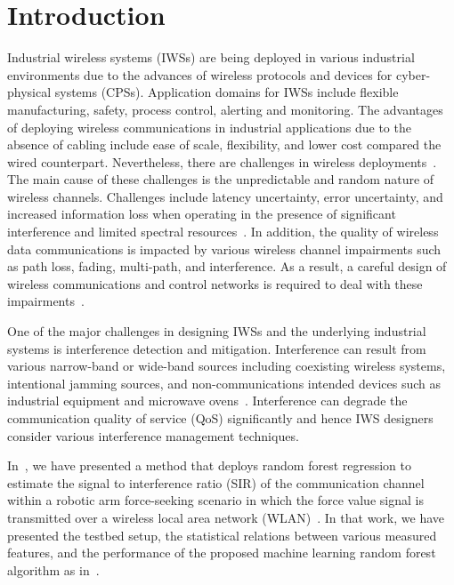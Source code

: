 	
	\section{Introduction} \label{ftml:sec:intro}    
	Industrial wireless systems (IWSs) are being deployed in various industrial environments due to the advances of wireless protocols and devices for cyber-physical systems (CPSs). Application domains for IWSs include flexible manufacturing, safety, process control, alerting and monitoring\cite{Candell2018.IWSGuide}. The advantages of deploying wireless communications in industrial applications due to the absence of cabling include ease of scale, flexibility, and lower cost compared the wired counterpart. Nevertheless, there are challenges in wireless deployments~\cite{Sisinni2018,Bello2017,Pang2017.WirelessChallenges}. The main cause of these challenges is the unpredictable and random nature of wireless channels. Challenges include latency uncertainty, error uncertainty, and  increased information loss when operating in the presence of significant interference and limited spectral resources~\cite{Candell2017.SAS.IWSWorkshopReport}. In addition, the quality of wireless data communications is impacted by various wireless channel impairments such as path loss, fading, multi-path, and interference. As a result, a careful design of wireless communications and control networks is required to deal with these impairments~\cite{Lu2016.WirelessCPS,Kim2017.WirelessCodesign}.    
    
    One of the major challenges in designing IWSs and the underlying industrial systems is interference detection and mitigation. Interference can result from various narrow-band or wide-band sources including  coexisting wireless systems, intentional jamming sources, and non-communications intended devices such as industrial equipment and microwave ovens~\cite{Chiwewe2015.Survey.CR.Intf}. Interference can degrade the communication quality of service (QoS) significantly and hence IWS designers consider various interference management techniques.   

    In~\cite{Candell_ISIT_2019}, we have presented a method that deploys random forest regression to estimate the signal to interference ratio (SIR) of the communication channel within a robotic arm force-seeking scenario in which the force value signal is transmitted over a wireless local area network (WLAN)~\cite{IEEE802.11ac}. In that work, we have presented the testbed setup, the statistical relations between various measured features, and the performance of the proposed machine learning random forest algorithm as in~\cite{Candell_ISIT_2019}.  
    
